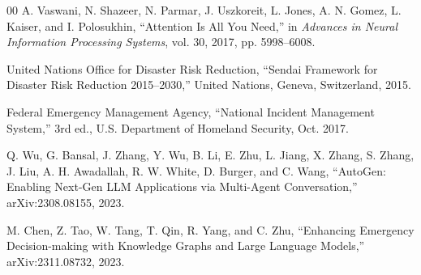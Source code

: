 \documentclass[conference]{IEEEtran}
\begin{document}
\begin{thebibliography}{00}
 A. Vaswani, N. Shazeer, N. Parmar, J. Uszkoreit, L. Jones, A. N. Gomez, L. Kaiser, and I. Polosukhin, ``Attention Is All You Need,'' in \textit{Advances in Neural Information Processing Systems}, vol. 30, 2017, pp. 5998--6008.

 United Nations Office for Disaster Risk Reduction, ``Sendai Framework for Disaster Risk Reduction 2015--2030,'' United Nations, Geneva, Switzerland, 2015.

 Federal Emergency Management Agency, ``National Incident Management System,'' 3rd ed., U.S. Department of Homeland Security, Oct. 2017.

 Q. Wu, G. Bansal, J. Zhang, Y. Wu, B. Li, E. Zhu, L. Jiang, X. Zhang, S. Zhang, J. Liu, A. H. Awadallah, R. W. White, D. Burger, and C. Wang, ``AutoGen: Enabling Next-Gen LLM Applications via Multi-Agent Conversation,'' arXiv:2308.08155, 2023.

 M. Chen, Z. Tao, W. Tang, T. Qin, R. Yang, and C. Zhu, ``Enhancing Emergency Decision-making with Knowledge Graphs and Large Language Models,'' arXiv:2311.08732, 2023.

\end{thebibliography}
\end{document}
